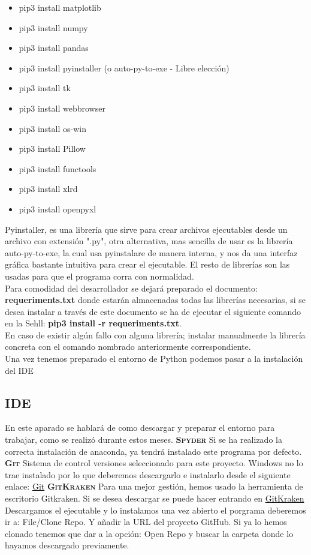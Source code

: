 \begin{itemize}
\item pip3 install matplotlib
\item pip3 install numpy
\item pip3 install pandas
\item pip3 install pyinstaller (o auto-py-to-exe - Libre elección)
\item pip3 install tk
\item pip3 install webbrowser
\item pip3 install os-win
\item pip3 install Pillow
\item pip3 install functools
\item pip3 install xlrd
\item pip3 install openpyxl
\end{itemize}
Pyinstaller, es una librería que sirve para crear archivos ejecutables desde un archivo con extensión ".py", otra alternativa, mas sencilla de usar es la librería auto-py-to-exe, la cual usa pyinstalare de manera interna, y nos da una interfaz gráfica bastante intuitiva para crear el ejecutable. El resto de librerías son las usadas para que el programa corra con normalidad.\\
Para comodidad del desarrollador se dejará preparado el documento: \textbf{requeriments.txt} donde estarán almacenadas todas las librerías necesarias, si se desea instalar a través de este documento se ha de ejecutar el siguiente comando en la Sehll: \textbf{pip3 install -r requeriments.txt}.\\
En caso de existir algún fallo con alguna librería; instalar manualmente la librería concreta con el comando nombrado anteriormente correspondiente.\\
Una vez tenemos preparado el entorno de Python podemos pasar a la instalación del IDE
\subsection{IDE}
En este aparado se hablará de como descargar y preparar el entorno para trabajar, como se realizó durante estos meses.
\textbf{\textsc{Spyder}}
Si se ha realizado la correcta instalación de anaconda, ya tendrá instalado este programa por defecto.
\textbf{\textsc{Git}}
Sistema de control versiones seleccionado para este proyecto. Windows no lo trae instalado por lo que deberemos descargarlo e instalarlo desde el siguiente enlace: \href{https://git-scm.com/}{Git}
\textbf{\textsc{GitKraken}}
Para una mejor gestión, hemos usado la herramienta de escritorio Gitkraken. Si se desea descargar se puede hacer entrando en \href{https://gitkraken.com/}{GitKraken}
Descargamos el ejecutable y lo instalamos una vez abierto el porgrama deberemos ir a: File/Clone Repo. Y añadir la URL del proyecto GitHub. Si ya lo hemos clonado tenemos que dar a la opción: Open Repo y buscar la carpeta donde lo hayamos descargado previamente.

